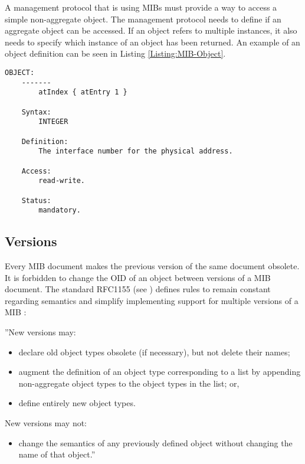 A management protocol that is using MIBs must provide a way to access a simple non-aggregate object. The management protocol needs to define if an aggregate object can be accessed. If an object refers to multiple instances, it also needs to specify which instance of an object has been returned. An example of an object definition can be seen in Listing \ref{Listing:MIB-Object}.

\begin{lstlisting}[label=Listing:MIB-Object,captionpos=b,caption={Example of an object definition (taken from \cite{RFC:RFC1155:1990})}]
    OBJECT:
    -------
        atIndex { atEntry 1 }
    
    Syntax:
        INTEGER
    
    Definition:
        The interface number for the physical address.
    
    Access:
        read-write.
    
    Status:
        mandatory.
\end{lstlisting}

\newpage
\subsection{Versions}
\label{Section:MIB-Versions}

Every MIB document makes the previous version of the same document obsolete. It is forbidden to change the OID of an object between versions of a MIB document. The standard RFC1155 (see \cite{RFC:RFC1155:1990}) defines rules to remain constant regarding semantics and simplify implementing support for multiple versions of a MIB \cite{RFC:RFC1155:1990}:

''New versions may:

\begin{minipage}{\textwidth}
\begin{itemize}
    \item declare old object types obsolete (if necessary), but not delete their names;
    \item augment the definition of an object type corresponding to a list by appending non-aggregate object types to the object types in the list; or,
    \item define entirely new object types.
\end{itemize}
\end{minipage}


New versions may not:

\begin{minipage}{\textwidth}
\begin{itemize}
    \item change the semantics of any previously defined object without
    changing the name of that object.''\cite{RFC:RFC1155:1990}
\end{itemize}
\end{minipage}


